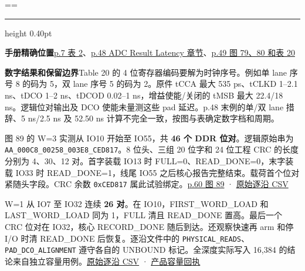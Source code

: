 \documentclass[UTF8,fontset=none,zihao=-4,a4paper]{ctexart}
\newcommand{\TraceSubsection}[1]{%
  \par\addvspace{7pt}\noindent{\large\bfseries\color{TraceTitle}#1\par}\nopagebreak[4]}
\newcommand{\TraceKeepHeading}{\par\penalty-120\relax}
\newcommand{\TraceItem}[1]{%
  \par{\color{TraceRule}\hrule height 0.40pt}\nobreak\smallskip%
  \noindent{\bfseries\color{TraceTitle}#1\par}\nopagebreak[4]}
\newcommand{\TraceField}[2]{%
  \par\noindent\textbf{\textcolor{TraceAccent}{#1}}\enspace#2\par}
\newenvironment{TraceCard}
  {\par\addvspace{4pt}\setbox\TraceCardBox=\vbox\bgroup\hsize=\linewidth}
  {\par\egroup
   \ifdim\dimexpr\ht\TraceCardBox+\dp\TraceCardBox\relax<0.30\textheight
     \box\TraceCardBox
   \else
     \unvbox\TraceCardBox
   \fi}
\newcommand{\TraceCode}[1]{\texttt{\mdseries\upshape #1}}
\begin{document}
\begin{TraceCard}
\TraceItem{连续读出时间}
\TraceField{手册精确位置}{\href{https://www.analog.com/media/en/technical-documentation/data-sheets/ad4080.pdf\#page=7}{p.7 表 2}、\allowbreak{}\href{https://www.analog.com/media/en/technical-documentation/data-sheets/ad4080.pdf\#page=48}{p.48 ADC Result Latency 章节}、\allowbreak{}\href{https://www.analog.com/media/en/technical-documentation/data-sheets/ad4080.pdf\#page=49}{p.49 图 79、\allowbreak{}80 和表 20}}
\TraceField{数字结果和保留边界}{Table 20 的 4 位寄存器编码要解为时钟序号。例如单 lane 序号 8 的码为 5，双 lane 序号 5 的码为 2。原件 tCCA 最大 535 ps、\allowbreak{}tCLKD 1–2.1 ns、\allowbreak{}tDCO 1–2 ns、\allowbreak{}tDCOD 0.02–1 ns，增益使能/关闭的 tMSB 最大 22.4/18 ns。逻辑位对输出及 DCO 使能未量测这些 pad 延迟。p.48 末例的单/双 lane 措辞、\allowbreak{}5 ns/2.5 ns 及 52.50 ns 计算不完全一致，按图与表确定数字档和周期。}
\end{TraceCard}


\TraceKeepHeading{}\hypertarget{trace-anchor-10}{}\TraceSubsection{产品 FIFO 的实际抓取值}

图 89 的 W=3 实测从 IO10 开始至 IO55，共 \textbf{46 个 DDR 位对}。逻辑原始串为 \TraceCode{AA\_\relax{}000C8\_\penalty150\relax{}00258\_\penalty150\relax{}003E8\_\penalty150\relax{}CED817}。8 位头、\allowbreak{}三组 20 位字和 24 位工程 CRC 的长度分别为 4、\allowbreak{}30、\allowbreak{}12 对。首字装载 IO13 时 FULL=0、\allowbreak{}READ\_\relax{}DONE=\relax{}0，末字装载 IO33 时 READ\_\relax{}DONE=\relax{}1，线尾 IO55 之后核心报告完整结束。载荷首个位对紧随头字段。CRC 余数 \TraceCode{0xCED817} 属此试验绑定。\href{https://www.analog.com/media/en/technical-documentation/data-sheets/ad4080.pdf\#page=60}{p.60 图 89} · \href{https://github.com/defineiocc02/20bit\_SAR\_ADC\_Behaviour\_Verification/blob/feat/ad4080-peripherals/subsys/ad4080\_peripherals/integration/product/evidence/pin\_edges.csv}{原始逐沿 CSV}\par

W=1 从 IO7 至 IO32 连续 \textbf{26 对}。在 IO10，FIRST\_\relax{}WORD\_\relax{}LOAD 和 LAST\_\relax{}WORD\_\relax{}LOAD 同为 1，FULL 清且 READ\_\relax{}DONE 置高。最后一个 CRC 位对在 IO32，核心 RECORD\_\relax{}DONE 随后到达。还观察快速再 arm 和停 I/O 时清 READ\_\relax{}DONE 后恢复。逐沿文件中的 \TraceCode{PHYSICAL\_\penalty150\relax{}READS}、\allowbreak{}\TraceCode{PAD\_\relax{}DCO\_\penalty150\relax{}ALIGNMENT} 遵守各自的 UNBOUND 标记。全深度实际写入 16,384 的结论来自独立容量用例。\href{https://github.com/defineiocc02/20bit\_SAR\_ADC\_Behaviour\_Verification/blob/feat/ad4080-peripherals/subsys/ad4080\_peripherals/integration/product/evidence/pin\_edges.csv}{原始逐沿 CSV} · \href{https://github.com/defineiocc02/20bit\_SAR\_ADC\_Behaviour\_Verification/blob/feat/ad4080-peripherals/subsys/ad4080\_peripherals/integration/product/evidence/verification.txt}{产品容量回执}\par
\end{document}
